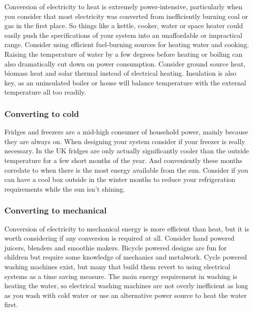 \documentclass{article}
\theoremstyle{definition}
\theoremstyle{definition}
\theoremstyle{remark}
\begin{document}
      Conversion of electricity to heat is extremely power-intensive, particularly when you consider that most electricity was converted from inefficiently burning coal or gas in the first place. So things like a kettle, cooker, water or space heater could easily push the specifications of your system into an unaffordable or impractical range. Consider using efficient fuel-burning sources for heating water and cooking. Raising the temperature of water by a few degrees before heating or boiling can also dramatically cut down on power consumption. Consider ground source heat, biomass heat and solar thermal instead of electrical heating. Insulation is also key, as an uninsulated boiler or house will balance temperature with the external temperature all too readily. 
    

    \subsubsection{Converting to cold} %
    \label{ssub:converting_to_cold}

      Fridges and freezers are a mid-high consumer of household power, mainly because they are always on. When designing your system consider if your freezer is really necessary. In the UK fridges are only actually significantly cooler than the outside temperature for a few short months of the year. And conveniently these months correlate to when there is the most energy available from the sun. Consider if you can have a cool box outside in the winter months to reduce your refrigeration requirements while the sun isn't shining. 
    

    \subsubsection{Converting to mechanical} %
    \label{ssub:converting_to_mechanical}

      Conversion of electricity to mechanical energy is more efficient than heat, but it is worth considering if any conversion is required at all. Consider hand powered juicers, blenders and smoothie makers. Bicycle powered designs are fun for children but require some knowledge of mechanics and metalwork. Cycle powered washing machines exist, but many that build them revert to using electrical systems as a time saving measure. The main energy requirement in washing is heating the water, so electrical washing machines are not overly inefficient as long as you wash with cold water or use an alternative power source to heat the water first. 
    
\end{document}

